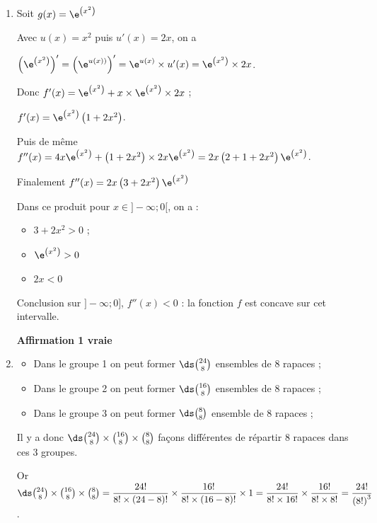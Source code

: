 \begin{enumerate}
		\item Soit $g(x) = \e^{\left(x^2\right)}$

		Avec $u(x) = x^2$ puis $u'(x) = 2x$, on a

		$\left(\e^{\left(x^2\right)}\right)' = \left(\e^{u(x))}\right)' = \e^{u(x)} \times u'(x) = \e^{\left(x^2\right)} \times 2x$.

		Donc $f'(x) = \e^{\left(x^2\right)} + x \times \e^{\left(x^2\right)} \times 2x$ ;

		$f'(x) = \e^{\left(x^2\right)}\left(1 + 2x^2\right)$.

		Puis de même $f''(x) = 4x\e^{\left(x^2\right)} + \left(1 + 2x^2\right) \times 2x \e^{\left(x^2\right)} = 2x \left(2 + 1 + 2x^2 \right)\e^{\left(x^2\right)}$.

		Finalement $f''(x) = 2x\left(3 + 2x^2 \right)\e^{\left(x^2\right)}$

		Dans ce produit pour $x \in ]- \infty ; 0[$, on a :

		\begin{itemize}
			\item $3 + 2x^2 > 0$ ;
			\item $\e^{\left(x^2\right)} > 0$
			\item $2x < 0$
		\end{itemize}

		Conclusion sur $]-\infty ; 0]$, \: $f''(x) < 0$ : la fonction $f$ est concave sur cet intervalle.

		\hfill\textbf{Affirmation 1 vraie}

		\item \begin{itemize}
			\item Dans le groupe 1 on peut former $\ds\binom{24}{8}$ ensembles de 8 rapaces ;

			\item Dans le groupe 2 on peut former $\ds\binom{16}{8}$ ensembles de 8 rapaces ;

			\item Dans le groupe 3 on peut former $\ds\binom{8}{8}$ ensemble de 8 rapaces ;
		\end{itemize}

		Il y a donc $\ds\binom{24}{8} \times \binom{16}{8} \times \binom{8}{8}$ façons différentes de répartir 8 rapaces dans ces 3 groupes.

		Or\quad $\ds \binom{24}{8} \times \binom{16}{8} \times \binom{8}{8} = \dfrac{24!}{8! \times (24- 8)!} \times \dfrac{16!}{8!\times (16-8)!} \times 1
		= \dfrac{24!}{8! \times 16!} \times \dfrac{16!}{8! \times 8!  }
		= \dfrac{24!}{\left (8!\right )^3}$.


\end{enumerate}
